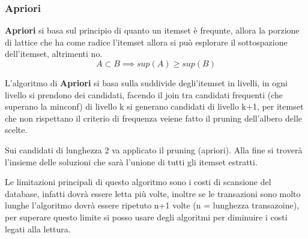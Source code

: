 \documentclass[12pt]{article}
\begin{document}
\subsubsection{Apriori}
\textbf{Apriori} si basa sul principio di quanto un itemset \`e frequnte, allora la porzione di lattice che ha come radice l'itemset allora si pu\`o esplorare il sottospazione dell'itemset, altrimenti no.
\[ A \subset B \implies sup(A) \geqslant  sup(B) \]

L'algoritmo di \textbf{Apriori} si basa sulla suddivide degli'itemset in  livelli, in ogni livello si prendono dei candidati, facendo il join tra candidati frequenti (che superano la minconf) di livello k si generano candidati di livello k+1, per itemset che non rispettano il criterio di frequenza veiene fatto il pruning dell'albero delle scelte.

Sui candidati di lunghezza 2 va applicato il pruning (apriori). Alla fine si trover\`a l'insieme delle soluzioni che sar\`a l'unione di tutti gli itemset estratti.

Le limitazioni principali di questo algoritmo sono i costi di scansione del database, infatti dovr\`a essere letta pi\`u volte, inoltre se le transazioni sono molto lunghe l'algoritmo dovr\`a essere ripetuto n+1 volte (n = lunghezza transazoine), per superare questo limite si posso usare degli algoritmi per diminuire i costi legati alla lettura.
\end{document}

